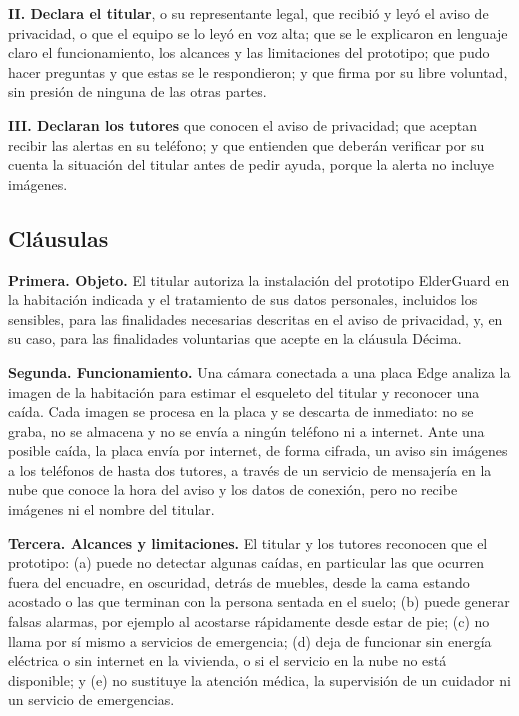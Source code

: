\documentclass[12pt,a4paper,oneside]{book}
\theoremstyle{plain}
\theoremstyle{definition}
\theoremstyle{remark}
\begin{document}
\textbf{II. Declara el titular}, o su representante legal, que recibió y leyó el aviso de privacidad, o que el equipo se lo leyó en voz alta; que se le explicaron en lenguaje claro el funcionamiento, los alcances y las limitaciones del prototipo; que pudo hacer preguntas y que estas se le respondieron; y que firma por su libre voluntad, sin presión de ninguna de las otras partes.

\textbf{III. Declaran los tutores} que conocen el aviso de privacidad; que aceptan recibir las alertas en su teléfono; y que entienden que deberán verificar por su cuenta la situación del titular antes de pedir ayuda, porque la alerta no incluye imágenes.

\subsection*{Cláusulas}

\textbf{Primera. Objeto.} El titular autoriza la instalación del prototipo ElderGuard en la habitación indicada y el tratamiento de sus datos personales, incluidos los sensibles, para las finalidades necesarias descritas en el aviso de privacidad, y, en su caso, para las finalidades voluntarias que acepte en la cláusula Décima.

\textbf{Segunda. Funcionamiento.} Una cámara conectada a una placa Edge analiza la imagen de la habitación para estimar el esqueleto del titular y reconocer una caída. Cada imagen se procesa en la placa y se descarta de inmediato: no se graba, no se almacena y no se envía a ningún teléfono ni a internet. Ante una posible caída, la placa envía por internet, de forma cifrada, un aviso sin imágenes a los teléfonos de hasta dos tutores, a través de un servicio de mensajería en la nube que conoce la hora del aviso y los datos de conexión, pero no recibe imágenes ni el nombre del titular.

\textbf{Tercera. Alcances y limitaciones.} El titular y los tutores reconocen que el prototipo: (a) puede no detectar algunas caídas, en particular las que ocurren fuera del encuadre, en oscuridad, detrás de muebles, desde la cama estando acostado o las que terminan con la persona sentada en el suelo; (b) puede generar falsas alarmas, por ejemplo al acostarse rápidamente desde estar de pie; (c) no llama por sí mismo a servicios de emergencia; (d) deja de funcionar sin energía eléctrica o sin internet en la vivienda, o si el servicio en la nube no está disponible; y (e) no sustituye la atención médica, la supervisión de un cuidador ni un servicio de emergencias.
\end{document}
